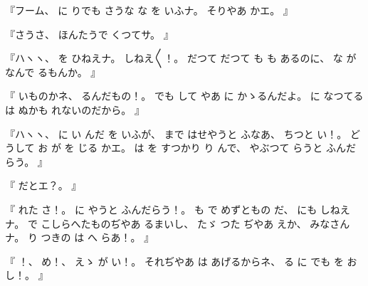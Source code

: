%
『フーム、
%
に
りでも
さうな
な
を
いふナ。
%
そりやあ
かエ。
』

%
『さうさ、
%
ほんたうで
くつてサ。
』

%
『ハヽヽ、
%
を
ひねえナ。
%
しねえ〳〵！。
%
だつて
だつて
も
も
あるのに、
%
な
がなんで
るもんか。
』

%
『
いものかネ、
%
るんだもの！。
%
でも
して
やあ
に
かゝるんだよ。
%
に
なつてる
は
ぬかも
れないのだから。
』

%
『ハヽヽ、
%
に
い
んだ
を
いふが、
%
まで
はせやうと
ふなあ、
%
ちつと
い！。
%
どうして
お
が
を
じる
かエ。
%
は
を
すつかり
り
んで、
やぶつて
らうと
ふんだらう。
』

%
『
だとエ？。
』

%
『
れた
さ！。
%
に
やうと
ふんだらう！。
%
も
で
めずともの
だ、
%
にも
しねえナ。
%
で
こしらへたものぢやあ
るまいし、
%
たゞ
つた
ぢやあ
えか、
%
みなさんナ。
%
り
つきの
は
へ
らあ！。
』

%
『
！、
%
め！、
%
えゝ
が
い！。
%
それぢやあ
は
あげるからネ、
%
る
に
でも
を
お
し！。
』
